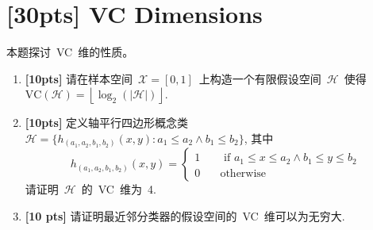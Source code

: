 \documentclass[a4paper,UTF8]{article}
\numberwithin{equation}{section}
\begin{document}
\newpage
\section{[30pts] VC Dimensions}
本题探讨~VC~维的性质。

\begin{enumerate}[(1)]
	\item \textbf{[10pts]} 请在样本空间~$\mathcal{X} = [0,1]$~上构造一个有限假设空间~$\mathcal{H}$~使得~$\mbox{VC}(\mathcal{H}) = \left \lfloor \log_2(\left| \mathcal{H} \right| ) \right \rfloor $.
	\item \textbf{[10pts]} 定义轴平行四边形概念类~$\mathcal H = \{h_{(a_1, a_2, b_1, b_2)}(x, y): a_1\le a_2 \land b_1\le b_2\}$, 其中
	\[ h_{(a_1, a_2, b_1, b_2)}(x, y) = \begin{cases}
	1&\quad \text{ if } a_1\le x\le a_2 \land b_1\le y \le b_2 \\
	0 & \quad \text{otherwise}
	\end{cases}
	\]
	请证明~$\mathcal H$~的~VC~维为~4.
	\item \textbf{[10 pts]} 请证明最近邻分类器的假设空间的~VC~维可以为无穷大.
\end{enumerate}
\end{document}
